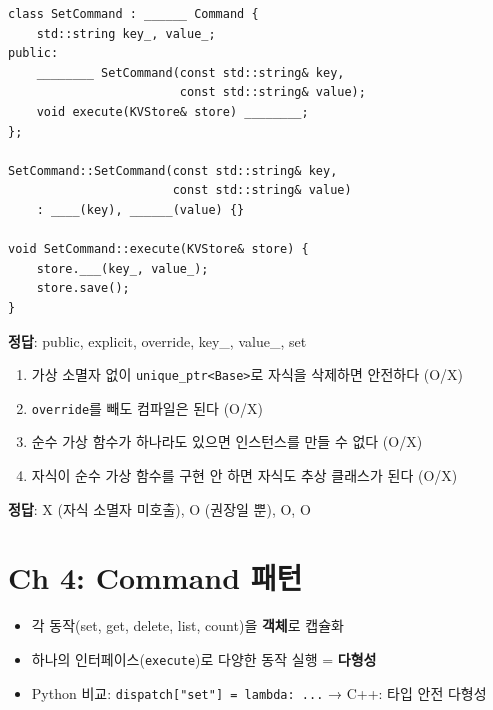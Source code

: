 \documentclass[11pt,a4paper]{article}
\newcommand{\code}[1]{\texttt{#1}}
\begin{document}
\begin{quizbox}[title={Q3-2: SetCommand}]
\begin{lstlisting}[style=cpp,numbers=none]
class SetCommand : ______ Command {
    std::string key_, value_;
public:
    ________ SetCommand(const std::string& key,
                        const std::string& value);
    void execute(KVStore& store) ________;
};

SetCommand::SetCommand(const std::string& key,
                       const std::string& value)
    : ____(key), ______(value) {}

void SetCommand::execute(KVStore& store) {
    store.___(key_, value_);
    store.save();
}
\end{lstlisting}
\textbf{정답}: public, explicit, override, key\_, value\_, set
\end{quizbox}

\begin{quizbox}[title={Q3-3: O/X}]
\begin{enumerate}[nosep]
\item 가상 소멸자 없이 \code{unique\_ptr<Base>}로 자식을 삭제하면 안전하다 (O/X)
\item \code{override}를 빼도 컴파일은 된다 (O/X)
\item 순수 가상 함수가 하나라도 있으면 인스턴스를 만들 수 없다 (O/X)
\item 자식이 순수 가상 함수를 구현 안 하면 자식도 추상 클래스가 된다 (O/X)
\end{enumerate}
\textbf{정답}: X (자식 소멸자 미호출), O (권장일 뿐), O, O
\end{quizbox}


\section{Ch 4: Command 패턴}

\begin{conceptbox}[title={Command 패턴}]
\begin{itemize}[nosep]
\item 각 동작(set, get, delete, list, count)을 \textbf{객체}로 캡슐화
\item 하나의 인터페이스(\code{execute})로 다양한 동작 실행 = \textbf{다형성}
\item Python 비교: \code{dispatch["set"] = lambda: ...} → C++: 타입 안전 다형성
\end{itemize}
\end{conceptbox}
\end{document}
